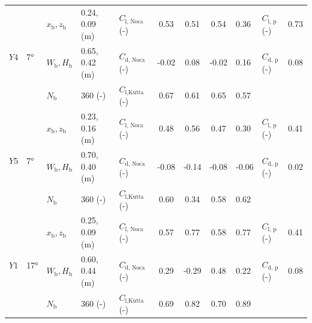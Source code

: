 \documentclass[wes, manuscript]{copernicus}
\begin{document}
\begin{table}[htp]
\begin{tabular}{p{0.5cm} p{0.8cm} p{.8cm} p{2.6cm} p{1.8cm} c c c p{1cm} p{1.3cm} c}
    \hline
    \multirow{3}{*}{$Y4$} & \multirow{3}{*}{7\unit{\degree}}
    & $x_{\textrm{b}},z_{\textrm{b}}$ & 0.24, 0.09 (\unit{m}) & $C_{\textrm{l, Noca}}$ (\unit{-})& 0.53 & 0.51 & 0.54 & 0.36 & $C_{\textrm{l, p}}$ (\unit{-})& 0.73 \\
    & & $W_{\textrm{b}}, H_{\textrm{b}}$ & 0.65, 0.42 (\unit{m}) & $C_{\textrm{d, Noca}}$ (\unit{-})& -0.02 & 0.08 & -0.02 & 0.16 & $C_{\textrm{d, p}}$ (\unit{-})& 0.08 \\
    & & $N_{\textrm{b}}$ & 360 (\unit{-}) & $C_{\textrm{l,Kutta}}$ (\unit{-})& 0.67 & 0.61 & 0.65 & 0.57 & & \\
    \hline
    \multirow{3}{*}{$Y5$} & \multirow{3}{*}{7\unit{\degree}}
    & $x_{\textrm{b}},z_{\textrm{b}}$ & 0.23, 0.16 (\unit{m}) & $C_{\textrm{l, Noca}}$ (\unit{-})& 0.48 & 0.56 & 0.47 & 0.30 & $C_{\textrm{l, p}}$ (\unit{-})& 0.41 \\
    & & $W_{\textrm{b}}, H_{\textrm{b}}$ & 0.70, 0.40 (\unit{m}) & $C_{\textrm{d, Noca}}$ (\unit{-})& -0.08 & -0.14 & -0.08 & -0.06 & $C_{\textrm{d, p}}$ (\unit{-})& 0.02 \\
    & & $N_{\textrm{b}}$ & 360 (\unit{-}) & $C_{\textrm{l,Kutta}}$ (\unit{-})& 0.60 & 0.34 & 0.58 & 0.62 & & \\
    \hline
    \multirow{3}{*}{$Y1$} & \multirow{3}{*}{17\unit{\degree}}
    & $x_{\textrm{b}},z_{\textrm{b}}$ & 0.25, 0.09 (\unit{m}) & $C_{\textrm{l, Noca}}$ (\unit{-})& 0.57 & 0.77 & 0.58 & 0.77 & $C_{\textrm{l, p}}$ (\unit{-})& 0.41 \\
    & & $W_{\textrm{b}}, H_{\textrm{b}}$ & 0.60, 0.44 (\unit{m}) & $C_{\textrm{d, Noca}}$ (\unit{-})& 0.29 & -0.29 & 0.48 & 0.22 & $C_{\textrm{d, p}}$ (\unit{-})& 0.08 \\
    & & $N_{\textrm{b}}$ & 360 (\unit{-}) & $C_{\textrm{l,Kutta}}$ (\unit{-})& 0.69 & 0.82 & 0.70 & 0.89 & & \\
    \hline
    \end{tabular}
    \label{tab:quantitative_results}
\end{table}
%
\end{document}
